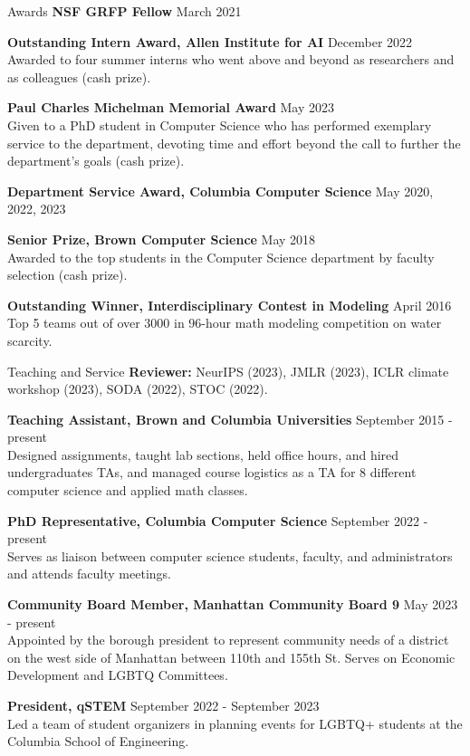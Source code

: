 \documentclass{resume} %
\begin{document}
\begin{rSection}{Awards} \itemsep -2pt
\textbf{NSF GRFP Fellow} \hfill March 2021

\textbf{Outstanding Intern Award, Allen Institute for AI} \hfill December 2022\\
Awarded to four summer interns who went above and beyond as researchers and as colleagues (cash prize).

\textbf{Paul Charles Michelman Memorial Award} \hfill May 2023 \\
Given to a PhD student in Computer Science who has performed exemplary service to the department, devoting time and effort beyond the call to further the department’s goals (cash prize).

\textbf{Department Service Award, Columbia Computer Science} \hfill May 2020, 2022, 2023

\textbf{Senior Prize, Brown Computer Science} \hfill May 2018 \\
Awarded to the top students in the Computer Science department by faculty selection (cash prize).

\textbf{Outstanding Winner, Interdisciplinary Contest in Modeling} \hfill April 2016 \\
Top 5 teams out of over 3000 in 96-hour math modeling competition on water scarcity.
\end{rSection}


\begin{rSection}{Teaching and Service} \itemsep -2pt
\textbf{Reviewer:} NeurIPS (2023), JMLR (2023), ICLR climate workshop (2023), SODA (2022), STOC (2022). 


\textbf{Teaching Assistant, Brown and Columbia Universities} \hfill September 2015 - present \\
Designed assignments, taught lab sections, held office hours, and hired undergraduates TAs, and managed course logistics as a TA for 8 different computer science and applied math classes.


\textbf{PhD Representative, Columbia Computer Science} \hfill September 2022 - present \\
Serves as liaison between computer science students, faculty, and administrators and attends faculty meetings.

\textbf{Community Board Member, Manhattan Community Board 9} \hfill May 2023 - present \\
Appointed by the borough president to represent community needs of a district on the west side of Manhattan between 110th and 155th St. Serves on Economic Development and LGBTQ Committees.

\textbf{President, qSTEM} \hfill September 2022 - September 2023 \\
Led a team of student organizers in planning events for LGBTQ+ students at the Columbia School of Engineering. 


\end{rSection}
\end{document}
